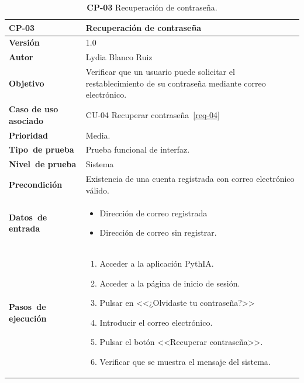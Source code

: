 \begin{table}[p]
	\centering
	\begin{tabularx}{\linewidth}{ p{} p{} }
		\toprule
		\textbf{CP-03}    & \textbf{Recuperación de contraseña}\\
		\toprule
		\textbf{Versión}              & 1.0    \\
		\textbf{Autor}                & Lydia Blanco Ruiz \\
		\textbf{Objetivo}			 & Verificar que un usuario puede solicitar el restablecimiento de su contraseña mediante correo electrónico.\\
		\textbf{Caso de uso asociado} &  CU-04 Recuperar contraseña~\ref{req-04}\\
		\textbf{Prioridad}          & Media. \\
		\textbf{\mbox{Tipo de} \mbox{prueba}}         & Prueba funcional de interfaz. \\
		\textbf{\mbox{Nivel de} \mbox{prueba}}        & Sistema\\
		\textbf{Precondición}        & Existencia de una cuenta registrada con correo electrónico válido. \\
		\textbf{\mbox{Datos de} \mbox{entrada}} 		& 
		\begin{itemize}
		\tightlist
			\item Dirección de correo registrada
			\item Dirección de correo sin registrar.
		\end{itemize}				
		\\
		\textbf{\mbox{Pasos de} \mbox{ejecución}}		&
		\begin{enumerate}
		\tightlist
			\item Acceder a la aplicación \eng{web} PythIA.
			\item Acceder a la página de inicio de sesión.
			\item Pulsar en <<¿Olvidaste tu contraseña?>>
			\item Introducir el correo electrónico.
			\item Pulsar el botón <<Recuperar contraseña>>.
			\item Verificar que se muestra el mensaje del sistema.
		\end{enumerate} \\
		\bottomrule
	\end{tabularx}
	\caption{\textbf{CP-03} Recuperación de contraseña.}
	\label{prueb-03}
\end{table}


